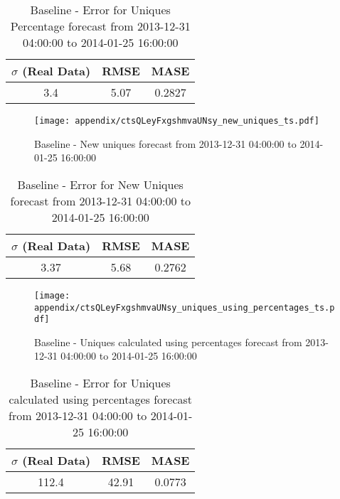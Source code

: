 \begin{table}[H]
\centering
\footnotesize
\begin{tabular}{ccc}
$\sigma$ (Real Data) & RMSE & MASE   \\ \hline
3.4 & 5.07 & 0.2827 \\
\end{tabular}

\vspace{0.5cm}

\caption{
Baseline - Error for Uniques Percentage forecast from 2013-12-31 04:00:00 to 2014-01-25 16:00:00}
\end{table}

\begin{figure}[H] \begin{center} \leavevmode
\texttt{[image: appendix/ctsQLeyFxgshmvaUNsy\_new\_uniques\_ts.pdf]} \caption{
Baseline - New uniques forecast from 2013-12-31 04:00:00 to 2014-01-25 16:00:00} \label{fig:appendix/ctsQLeyFxgshmvaUNsy_new_uniques_ts.pdf} \end{center}
\end{figure}

\begin{table}[H]
\centering
\footnotesize
\begin{tabular}{ccc}
$\sigma$ (Real Data) & RMSE & MASE   \\ \hline
3.37 & 5.68 & 0.2762 \\
\end{tabular}

\vspace{0.5cm}

\caption{
Baseline - Error for New Uniques forecast from 2013-12-31 04:00:00 to 2014-01-25 16:00:00}
\end{table}

\begin{figure}[H] \begin{center} \leavevmode
\texttt{[image: appendix/ctsQLeyFxgshmvaUNsy\_uniques\_using\_percentages\_ts.pdf]} \caption{
Baseline - Uniques calculated using percentages forecast from 2013-12-31 04:00:00 to 2014-01-25 16:00:00} \label{fig:appendix/ctsQLeyFxgshmvaUNsy_uniques_using_percentages_ts.pdf} \end{center}
\end{figure}

\begin{table}[H]
\centering
\footnotesize
\begin{tabular}{ccc}
$\sigma$ (Real Data) & RMSE & MASE   \\ \hline
112.4 & 42.91 & 0.0773 \\
\end{tabular}

\vspace{0.5cm}

\caption{
Baseline - Error for Uniques calculated using percentages forecast from 2013-12-31 04:00:00 to 2014-01-25 16:00:00}
\end{table}

